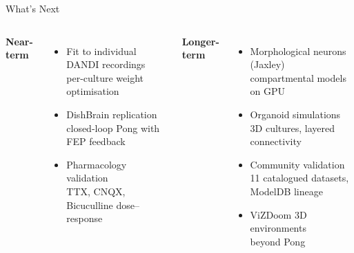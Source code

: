 \documentclass[aspectratio=169,10pt]{beamer}
\begin{document}
\begin{frame}{What's Next}
\begin{columns}[T]
\textbf{Near-term}
\begin{itemize}\small
  \item Fit to individual DANDI recordings\\
        {\scriptsize per-culture weight optimisation}
  \item DishBrain replication\\
        {\scriptsize closed-loop Pong with FEP feedback}
  \item Pharmacology validation\\
        {\scriptsize TTX, CNQX, Bicuculline dose--response}
\end{itemize}

\textbf{Longer-term}
\begin{itemize}\small
  \item Morphological neurons (Jaxley)\\
        {\scriptsize compartmental models on GPU}
  \item Organoid simulations\\
        {\scriptsize 3D cultures, layered connectivity}
  \item Community validation\\
        {\scriptsize 11 catalogued datasets, ModelDB lineage}
  \item ViZDoom 3D environments\\
        {\scriptsize beyond Pong}
\end{itemize}
\end{columns}

\vspace{16pt}
\centering
{}
\end{frame}
\end{document}
